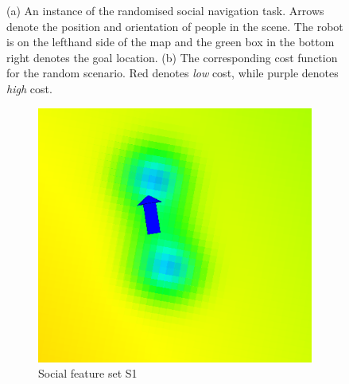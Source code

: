 \documentclass{article}  %
\begin{document}
\begin{figure}[tbh]
  \caption{(a) An instance of the randomised social navigation task. Arrows denote the position and orientation of people in the scene. The robot is on the lefthand side of the map and the green box in the bottom right denotes the goal location. (b) The corresponding cost function for the random scenario. Red denotes \emph{low} cost, while purple denotes \emph{high} cost.}

    \vspace{-2mm}

  \label{fig:setting}
  \end{figure}


	\begin{figure}[tbh]
	\centering
      \begin{subfigure}[b]{0.42\columnwidth}
    \includegraphics[scale=0.2]{images/person_feat2.png}
    \caption{Social feature set S1}
    \label{fig:S1}
  \end{subfigure}
  \hspace{10mm}
  \begin{subfigure}[b]{0.42\columnwidth}
  \hspace{4mm}

\end{subfigure}
\end{figure}
\end{document}

